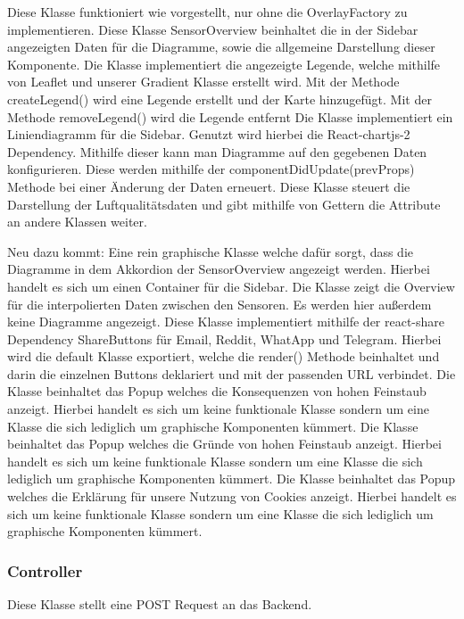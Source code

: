     Diese Klasse funktioniert wie vorgestellt, nur ohne die OverlayFactory zu implementieren.
    Diese Klasse SensorOverview beinhaltet die in der Sidebar angezeigten Daten für die Diagramme, sowie die allgemeine Darstellung dieser Komponente.
    Die Klasse implementiert die angezeigte Legende, welche mithilfe von \gls{Leaflet} und unserer Gradient Klasse erstellt wird.
    Mit der Methode createLegend() wird eine Legende erstellt und der Karte hinzugefügt.
    Mit der Methode removeLegend() wird die Legende entfernt
    Die Klasse implementiert ein Liniendiagramm für die Sidebar. Genutzt wird hierbei die React-chartjs-2 Dependency.
    Mithilfe dieser kann man Diagramme auf den gegebenen Daten konfigurieren. Diese werden mithilfe der componentDidUpdate(prevProps) Methode
    bei einer Änderung der Daten erneuert.
    \removedClass
{}
    \removedClass
{}
    Diese Klasse steuert die Darstellung der Luftqualitätsdaten und gibt mithilfe von Gettern die Attribute an andere Klassen weiter.

Neu dazu kommt:
    Eine rein graphische Klasse welche dafür sorgt, dass die Diagramme in dem Akkordion der SensorOverview angezeigt werden.
    Hierbei handelt es sich um einen Container für die Sidebar.
    Die Klasse zeigt die Overview für die interpolierten Daten zwischen den Sensoren. Es werden hier außerdem keine Diagramme angezeigt.
    Diese Klasse implementiert mithilfe der react-share Dependency ShareButtons für Email, Reddit, WhatApp und Telegram.
    Hierbei wird die default Klasse exportiert, welche die render() Methode beinhaltet und darin die einzelnen Buttons deklariert und 
    mit der passenden URL verbindet.
    Die Klasse beinhaltet das Popup welches die Konsequenzen von hohen Feinstaub anzeigt. Hierbei handelt es sich um keine funktionale Klasse sondern um eine Klasse die sich
    lediglich um graphische Komponenten kümmert.
    Die Klasse beinhaltet das Popup welches die Gründe von hohen Feinstaub anzeigt. Hierbei handelt es sich um keine funktionale Klasse sondern um eine Klasse die sich
    lediglich um graphische Komponenten kümmert.
    Die Klasse beinhaltet das Popup welches die Erklärung für unsere Nutzung von \gls{Cookie}s anzeigt. Hierbei handelt es sich um keine funktionale Klasse sondern um eine Klasse die sich
    lediglich um graphische Komponenten kümmert.

\subsubsection{Controller}
    Diese Klasse stellt eine POST Request an das Backend.